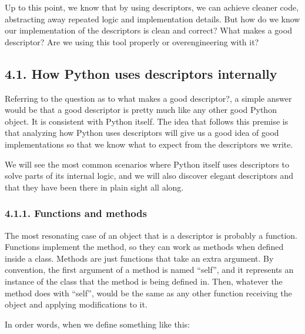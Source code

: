 \documentclass[a4paper,10pt,english]{sphinxmanual}
\begin{document}
Up to this point, we know that by using descriptors, we can achieve cleaner code,
abstracting away repeated logic and implementation details. But how do we know our
implementation of the descriptors is clean and correct? What makes a good descriptor? Are
we using this tool properly or over\sphinxhyphen{}engineering with it?


\subsection{4.1. How Python uses descriptors internally}
\label{\detokenize{chapters/6_descriptors/index:how-python-uses-descriptors-internally}}
Referring to the question as to what makes a good descriptor?, a simple answer would be
that a good descriptor is pretty much like any other good Python object. It is consistent with
Python itself. The idea that follows this premise is that analyzing how Python uses
descriptors will give us a good idea of good implementations so that we know what to
expect from the descriptors we write.

We will see the most common scenarios where Python itself uses descriptors to solve parts
of its internal logic, and we will also discover elegant descriptors and that they have been
there in plain sight all along.


\subsubsection{4.1.1. Functions and methods}
\label{\detokenize{chapters/6_descriptors/index:functions-and-methods}}
The most resonating case of an object that is a descriptor is probably a function. Functions
implement the  method, so they can work as methods when defined inside a class.
Methods are just functions that take an extra argument. By convention, the first argument
of a method is named “self”, and it represents an instance of the class that the method is
being defined in. Then, whatever the method does with “self”, would be the same as any
other function receiving the object and applying modifications to it.

In order words, when we define something like this:

\begin{sphinxVerbatim}[commandchars=\\\{\}]
 
      
          
\end{sphinxVerbatim}
\end{document}
